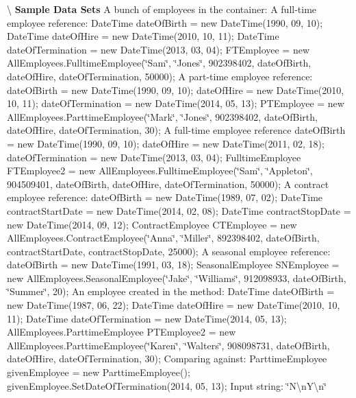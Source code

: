 \textbackslash{} {\bfseries  Sample Data Sets} A bunch of employees in the container\+: A full-\/time employee reference\+: Date\+Time date\+Of\+Birth = new Date\+Time(1990, 09, 10); Date\+Time date\+Of\+Hire = new Date\+Time(2010, 10, 11); Date\+Time date\+Of\+Termination = new Date\+Time(2013, 03, 04); F\+T\+Employee = new All\+Employees.\+Fulltime\+Employee(\char`\"{}\+Sam\char`\"{}, \char`\"{}\+Jones\char`\"{}, 902398402, date\+Of\+Birth, date\+Of\+Hire, date\+Of\+Termination, 50000); A part-\/time employee reference\+: date\+Of\+Birth = new Date\+Time(1990, 09, 10); date\+Of\+Hire = new Date\+Time(2010, 10, 11); date\+Of\+Termination = new Date\+Time(2014, 05, 13); P\+T\+Employee = new All\+Employees.\+Parttime\+Employee(\char`\"{}\+Mark\char`\"{}, \char`\"{}\+Jones\char`\"{}, 902398402, date\+Of\+Birth, date\+Of\+Hire, date\+Of\+Termination, 30); A full-\/time employee reference date\+Of\+Birth = new Date\+Time(1990, 09, 10); date\+Of\+Hire = new Date\+Time(2011, 02, 18); date\+Of\+Termination = new Date\+Time(2013, 03, 04); Fulltime\+Employee F\+T\+Employee2 = new All\+Employees.\+Fulltime\+Employee(\char`\"{}\+Sam\char`\"{}, \char`\"{}\+Appleton\char`\"{}, 904509401, date\+Of\+Birth, date\+Of\+Hire, date\+Of\+Termination, 50000); A contract employee reference\+: date\+Of\+Birth = new Date\+Time(1989, 07, 02); Date\+Time contract\+Start\+Date = new Date\+Time(2014, 02, 08); Date\+Time contract\+Stop\+Date = new Date\+Time(2014, 09, 12); Contract\+Employee C\+T\+Employee = new All\+Employees.\+Contract\+Employee(\char`\"{}\+Anna\char`\"{}, \char`\"{}\+Miller\char`\"{}, 892398402, date\+Of\+Birth, contract\+Start\+Date, contract\+Stop\+Date, 25000); A seasonal employee reference\+: date\+Of\+Birth = new Date\+Time(1991, 03, 18); Seasonal\+Employee S\+N\+Employee = new All\+Employees.\+Seasonal\+Employee(\char`\"{}\+Jake\char`\"{}, \char`\"{}\+Williams\char`\"{}, 912098933, date\+Of\+Birth, \char`\"{}\+Summer\char`\"{}, 20); An employee created in the method\+: Date\+Time date\+Of\+Birth = new Date\+Time(1987, 06, 22); Date\+Time date\+Of\+Hire = new Date\+Time(2010, 10, 11); Date\+Time date\+Of\+Termination = new Date\+Time(2014, 05, 13); All\+Employees.\+Parttime\+Employee P\+T\+Employee2 = new All\+Employees.\+Parttime\+Employee(\char`\"{}\+Karen\char`\"{}, \char`\"{}\+Walters\char`\"{}, 908098731, date\+Of\+Birth, date\+Of\+Hire, date\+Of\+Termination, 30); Comparing against\+: Parttime\+Employee given\+Employee = new Parttime\+Employee(); given\+Employee.\+Set\+Date\+Of\+Termination(2014, 05, 13); Input string\+: \char`\"{}\+N\textbackslash{}n\+Y\textbackslash{}n\char`\"{}

